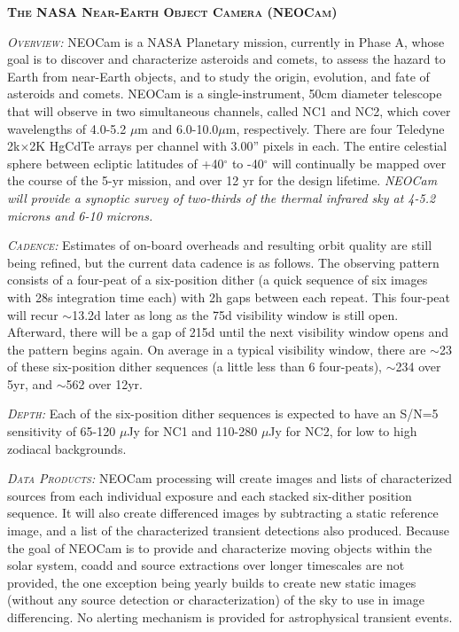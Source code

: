 \documentclass[12pt]{article}
\begin{document}
\smallskip
\smallskip
\noindent
{\bfseries \textsc{\textcolor{Cerulean}{The NASA Near-Earth Object Camera (NEOCam)}}}

\textsl{\textsc{Overview:}}
NEOCam is a NASA Planetary mission, currently in Phase A, whose goal
is to discover and characterize asteroids and comets, to assess the
hazard to Earth from near-Earth objects, and to study the origin,
evolution, and fate of asteroids and comets. NEOCam is a
single-instrument, 50cm diameter telescope that will observe in two
simultaneous channels, called NC1 and NC2, which cover wavelengths of
4.0-5.2 $\mu$m and 6.0-10.0$\mu$m, respectively. There are four Teledyne
2k$\times$2K HgCdTe arrays per channel with 3.00'' pixels in each. The entire
celestial sphere between ecliptic latitudes of +40$^{\circ}$ to -40$^{\circ}$ will
continually be mapped over the course of the 5-yr mission, and over 12
yr for the design lifetime. 
{\it NEOCam will provide a synoptic survey of two-thirds of the thermal infrared sky at 4-5.2 microns and 6-10 microns.}

\smallskip
\smallskip
\noindent
\textsl{\textsc{Cadence:}} Estimates of on-board overheads and resulting orbit quality are still being refined, but the current data cadence is as follows. The observing pattern consists of a four-peat of a six-position dither (a quick sequence of six images with 28s integration time each) with 2h gaps between each repeat. This four-peat will recur $\sim$13.2d later as long as the 75d visibility window is still open. Afterward, there will be a gap of 215d until the next visibility window opens and the pattern begins again. On average in a typical visibility window, there are $\sim$23 of these six-position dither sequences (a little less than 6 four-peats), $\sim$234 over 5yr, and $\sim$562 over 12yr.

\smallskip
\smallskip
\noindent
\textsl{\textsc{Depth:}} Each of the six-position dither sequences is expected to have an S/N=5 sensitivity of 65-120 $\mu$Jy for NC1 and 110-280 $\mu$Jy for NC2, for low to high zodiacal backgrounds. 

\smallskip
\smallskip
\noindent
\textsl{\textsc{Data Products:}} NEOCam processing will create images and lists of characterized sources from each individual exposure and each stacked six-dither position sequence. It will also create differenced images by subtracting a static reference image, and a list of the characterized transient detections also produced. Because the goal of NEOCam is to provide and characterize moving objects within the solar system, coadd and source extractions over longer timescales are not provided, the one exception being yearly builds to create new static images (without any source detection or characterization) of the sky to use in image differencing. No alerting mechanism is provided for astrophysical transient events.  
\end{document}
